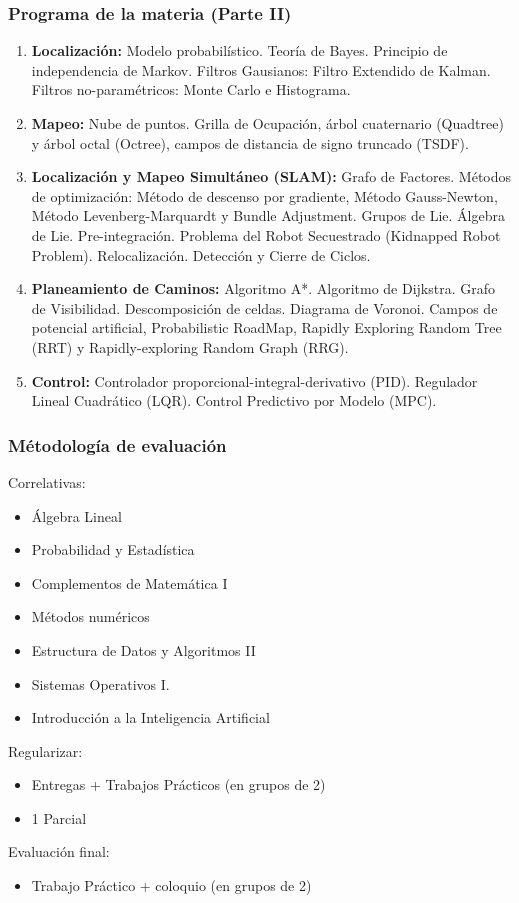\begin{frame}
	\frametitle{Programa de la materia (Parte II)}
	\footnotesize
	\begin{enumerate}

		\item {\bf Localización:} Modelo probabilístico. Teoría de Bayes. Principio de independencia de Markov. Filtros Gausianos: Filtro Extendido de Kalman. Filtros no-paramétricos: Monte Carlo e Histograma.

		\item {\bf Mapeo:} Nube de puntos. Grilla de Ocupación, árbol cuaternario (Quadtree) y árbol octal (Octree), campos de distancia de signo truncado (TSDF).
		
		\item {\bf Localización y Mapeo Simultáneo (SLAM):} Grafo de Factores. Métodos de optimización: Método de descenso por gradiente, Método Gauss-Newton, Método Levenberg-Marquardt y Bundle Adjustment. Grupos de Lie. Álgebra de Lie. Pre-integración. Problema del Robot Secuestrado (Kidnapped Robot Problem). Relocalización. Detección y Cierre de Ciclos.
		
		\item {\bf Planeamiento de Caminos:} Algoritmo A*. Algoritmo de Dijkstra. Grafo de Visibilidad. Descomposición de celdas. Diagrama de Voronoi. Campos de potencial artificial, Probabilistic RoadMap, Rapidly Exploring Random Tree (RRT) y Rapidly-exploring Random Graph (RRG).
		
		\item {\bf Control:} Controlador proporcional-integral-derivativo (PID). Regulador Lineal Cuadrático (LQR). Control Predictivo por Modelo (MPC).
		
	\end{enumerate}

\end{frame}

\begin{frame}
	\frametitle{Métodología de evaluación}
	
	Correlativas:
	\begin{itemize}
		\item Álgebra Lineal
		\item Probabilidad y Estadística
		\item Complementos de Matemática I
		\item Métodos numéricos
		\item Estructura de Datos y Algoritmos II
		\item Sistemas Operativos I.
		\item Introducción a la Inteligencia Artificial
	\end{itemize}
	
	Regularizar:
	\begin{itemize}
		\item Entregas + Trabajos Prácticos (en grupos de 2)
		\item 1 Parcial
	\end{itemize}

	Evaluación final:
	\begin{itemize}
		\item Trabajo Práctico + coloquio (en grupos de 2)
	\end{itemize}	
\end{frame}